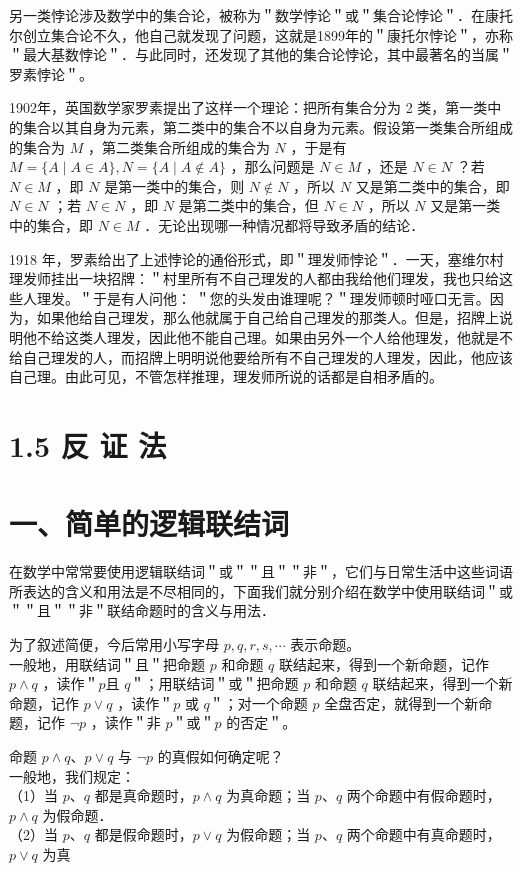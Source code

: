 \documentclass[10pt]{article}
\begin{document}
另一类悖论涉及数学中的集合论，被称为＂数学悖论＂或＂集合论悖论＂．在康托尔创立集合论不久，他自己就发现了问题，这就是1899年的＂康托尔悖论＂，亦称＂最大基数悖论＂．与此同时，还发现了其他的集合论悖论，其中最著名的当属＂罗素悖论＂。

1902年，英国数学家罗素提出了这样一个理论：把所有集合分为 2 类，第一类中的集合以其自身为元素，第二类中的集合不以自身为元素。假设第一类集合所组成的集合为 \(M\) ，第二类集合所组成的集合为 \(N\) ，于是有 \(M=\{A \mid A \in A\}, N=\{A \mid A \notin A\}\) ，那么问题是 \(N \in M\) ，还是 \(N \in N\) ？若 \(N \in M\) ，即 \(N\) 是第一类中的集合，则 \(N \notin N\) ，所以 \(N\) 又是第二类中的集合，即 \(N \in N\) ；若 \(N \in N\) ，即 \(N\) 是第二类中的集合，但 \(N \in N\) ，所以 \(N\) 又是第一类中的集合，即 \(N \in M\) ．无论出现哪一种情况都将导致矛盾的结论．

1918 年，罗素给出了上述悖论的通俗形式，即＂理发师悖论＂．一天，塞维尔村理发师挂出一块招牌：＂村里所有不自己理发的人都由我给他们理发，我也只给这些人理发。＂于是有人问他： ＂您的头发由谁理呢？＂理发师顿时哑口无言。因为，如果他给自己理发，那么他就属于自己给自己理发的那类人。但是，招牌上说明他不给这类人理发，因此他不能自己理。如果由另外一个人给他理发，他就是不给自己理发的人，而招牌上明明说他要给所有不自己理发的人理发，因此，他应该自己理。由此可见，不管怎样推理，理发师所说的话都是自相矛盾的。

\section*{1.5 反 证 法}
\section*{一、简单的逻辑联结词}
在数学中常常要使用逻辑联结词＂或＂＂且＂＂非＂，它们与日常生活中这些词语所表达的含义和用法是不尽相同的，下面我们就分别介绍在数学中使用联结词＂或＂＂且＂＂非＂联结命题时的含义与用法．

为了叙述简便，今后常用小写字母 \(p, q, r, s, \cdots\) 表示命题。\\
一般地，用联结词＂且＂把命题 \(p\) 和命题 \(q\) 联结起来，得到一个新命题，记作 \(p \wedge q\) ，读作＂\(p\)且 \(q\)＂；用联结词＂或＂把命题 \(p\) 和命题 \(q\) 联结起来，得到一个新命题，记作 \(p \vee q\) ，读作＂\(p\) 或 \(q\)＂；对一个命题 \(p\) 全盘否定，就得到一个新命题，记作 \(\neg p\) ，读作＂非 \(p\)＂或＂\(p\) 的否定＂。

命题 \(p \wedge q 、 p \vee q\) 与 \(\neg p\) 的真假如何确定呢？\\
一般地，我们规定：\\
（1）当 \(p 、 q\) 都是真命题时，\(p \wedge q\) 为真命题；当 \(p 、 q\) 两个命题中有假命题时，\(p \wedge q\) 为假命题．\\
（2）当 \(p 、 q\) 都是假命题时，\(p \vee q\) 为假命题；当 \(p 、 q\) 两个命题中有真命题时，\(p \vee q\) 为真
\end{document}
